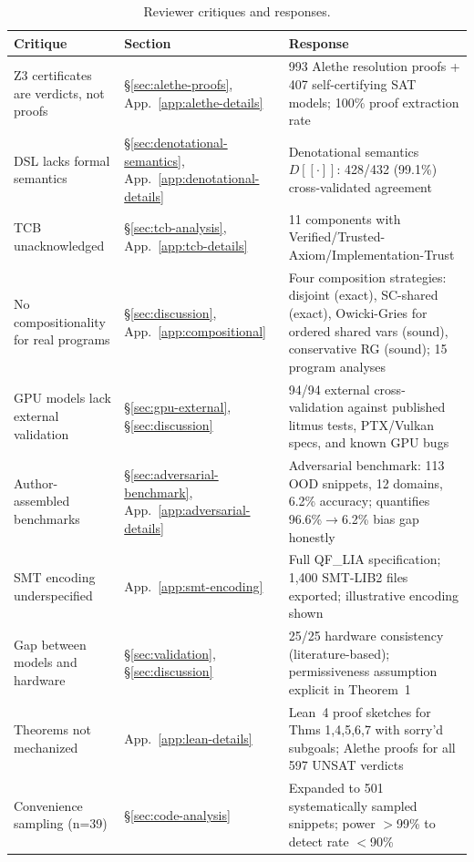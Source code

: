 \documentclass[11pt]{article}
\begin{document}
\begin{longtable}{p{5cm}p{2cm}p{5cm}}
\caption{Reviewer critiques and responses.}
\label{tab:critique-response} \\
\toprule
\textbf{Critique} & \textbf{Section} & \textbf{Response} \\
\midrule
\endfirsthead
\endhead
\bottomrule
\endfoot
Z3 certificates are verdicts, not proofs &
  \S\ref{sec:alethe-proofs}, App.~\ref{app:alethe-details} &
  993 Alethe resolution proofs + 407 self-certifying SAT models;
  100\% proof extraction rate \\
DSL lacks formal semantics &
  \S\ref{sec:denotational-semantics}, App.~\ref{app:denotational-details} &
  Denotational semantics $D[\![\cdot]\!]$: 428/432 (99.1\%)
  cross-validated agreement \\
TCB unacknowledged &
  \S\ref{sec:tcb-analysis}, App.~\ref{app:tcb-details} &
  11 components with Verified/Trusted-Axiom/Implementation-Trust \\
No compositionality for real programs &
  \S\ref{sec:discussion}, App.~\ref{app:compositional} &
  Four composition strategies: disjoint (exact), SC-shared (exact),
  Owicki-Gries for ordered shared vars (sound),
  conservative RG (sound); 15 program analyses \\
GPU models lack external validation &
  \S\ref{sec:gpu-external}, \S\ref{sec:discussion} &
  94/94 external cross-validation against published litmus tests,
  PTX/Vulkan specs, and known GPU bugs \\
Author-assembled benchmarks &
  \S\ref{sec:adversarial-benchmark}, App.~\ref{app:adversarial-details} &
  Adversarial benchmark: 113 OOD snippets, 12 domains, 6.2\% accuracy;
  quantifies 96.6\%$\to$6.2\% bias gap honestly \\
SMT encoding underspecified &
  App.~\ref{app:smt-encoding} &
  Full QF\_LIA specification; 1{,}400 SMT-LIB2 files exported;
  illustrative encoding shown \\
Gap between models and hardware &
  \S\ref{sec:validation}, \S\ref{sec:discussion} &
  25/25 hardware consistency (literature-based);
  permissiveness assumption explicit in Theorem~1 \\
Theorems not mechanized &
  App.~\ref{app:lean-details} &
  Lean~4 proof sketches for Thms 1,4,5,6,7 with sorry'd subgoals;
  Alethe proofs for all 597 UNSAT verdicts \\
Convenience sampling (n=39) &
  \S\ref{sec:code-analysis} &
  Expanded to 501 systematically sampled snippets;
  power $>$99\% to detect rate $<$90\% \\

\end{longtable}
\end{document}
